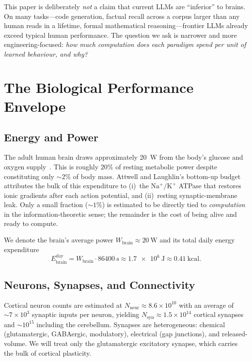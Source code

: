 \documentclass[11pt]{article}
\providecommand{\watt}{\ensuremath{\mathrm{W}}}
\providecommand{\joule}{\ensuremath{\mathrm{J}}}
\providecommand{\second}{\ensuremath{\mathrm{s}}}
\providecommand{\calorie}{\ensuremath{\mathrm{cal}}}
\providecommand{\kilo}{\ensuremath{\mathrm{k}}}
\theoremstyle{definition}
\theoremstyle{remark}
\newcommand{\Wbrain}{W_{\mathrm{brain}}}
\newcommand{\Ebrain}{E_{\mathrm{brain}}}
\newcommand{\Nsyn}{N_{\mathrm{syn}}}
\begin{document}
This paper is deliberately \emph{not} a claim that current LLMs are
``inferior'' to brains.  On many tasks---code generation, factual
recall across a corpus larger than any human reads in a lifetime,
formal mathematical reasoning---frontier LLMs already exceed typical
human performance.  The question we ask is narrower and more
engineering-focused: \emph{how much computation does each paradigm
spend per unit of learned behaviour, and why?}

\section{The Biological Performance Envelope}
\label{sec:bio}

\subsection{Energy and Power}

The adult human brain draws approximately \SI{20}{\watt} from the
body's glucose and oxygen supply~\cite{brainfacts2019energy,
attwell2001energy, lennie2003cost}.  This is roughly
$20\%$ of resting metabolic power despite constituting only $\sim 2\%$
of body mass.  Attwell and Laughlin's bottom-up
budget~\cite{attwell2001energy} attributes the bulk of this
expenditure to (i)~the $\mathrm{Na^{+}/K^{+}}$ ATPase that restores
ionic gradients after each action potential, and (ii)~resting
synaptic-membrane leak.  Only a small fraction ($\sim 1$\%) is
estimated to be directly tied to \emph{computation} in the
information-theoretic sense; the remainder is the cost of being
alive and ready to compute.

We denote the brain's average power $\Wbrain \approx \SI{20}{\watt}$
and its total daily energy expenditure
\[
  \Ebrain^{\mathrm{day}} = \Wbrain \cdot \SI{86400}{\second}
  \approx \SI{1.7e6}{\joule} \approx \SI{0.41}{\kilo\calorie}.
\]

\subsection{Neurons, Synapses, and Connectivity}

Cortical neuron counts are estimated at $N_{\mathrm{neur}}\approx
8.6\times 10^{10}$ with an average of $\sim 7\times 10^{3}$ synaptic
inputs per neuron, yielding $\Nsyn\approx 1.5\times 10^{14}$ cortical
synapses and $\sim 10^{15}$ including the cerebellum.  Synapses are
heterogeneous: chemical (glutamatergic, GABAergic, modulatory),
electrical (gap junctions), and released-volume.  We will treat only
the glutamatergic excitatory synapse, which carries the bulk of
cortical plasticity.
\end{document}
